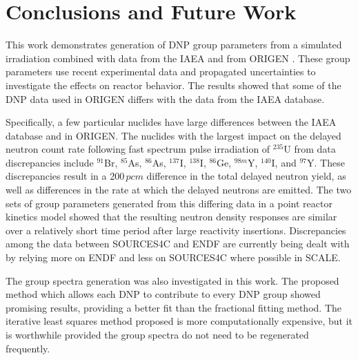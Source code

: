\documentclass{style/nseJournal}
\begin{document}


\section{Conclusions and Future Work}

This work demonstrates generation of DNP group parameters from a simulated irradiation combined with data from the IAEA and from ORIGEN \cite{DIMITRIOU2021144}.
These group parameters use recent experimental data and propagated uncertainties to investigate the effects on reactor behavior.
The results showed that some of the DNP data used in ORIGEN differs with the data from the IAEA database.

Specifically, a few particular nuclides have large differences between the IAEA database and in ORIGEN.
The nuclides with the largest impact on the delayed neutron count rate following fast spectrum pulse irradiation of $^{235}$U from data discrepancies include $^{91}$Br, $^{85}$As, $^{86}$As, $^{137}$I, $^{138}$I, $^{86}$Ge, $^{98m}$Y, $^{140}$I, and $^{97}$Y.
These discrepancies result in a 200$\,pcm$ difference in the total delayed neutron yield, as well as differences in the rate at which the delayed neutrons are emitted.
The two sets of group parameters generated from this differing data in a point reactor kinetics model showed that the resulting neutron density responses are similar over a relatively short time period after large reactivity insertions.
Discrepancies among the data between SOURCES4C and ENDF are currently being dealt with by relying more on ENDF and less on SOURCES4C where possible in SCALE.

The group spectra generation was also investigated in this work.
The proposed method which allows each DNP to contribute to every DNP group showed promising results, providing a better fit than the fractional fitting method.
The iterative least squares method proposed is more computationally expensive, but it is worthwhile provided the group spectra do not need to be regenerated frequently.
\end{document}
